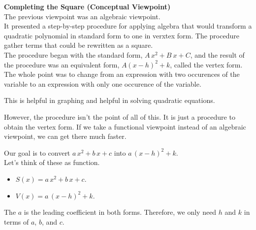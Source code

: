 \documentclass{ximera}
\begin{document}
\textbf{\textcolor{blue!55!black}{Completing the Square (Conceptual Viewpoint)}} \\






The previous viewpoint was an algebraic viewpoint.  \\

It presented a step-by-step procedure for applying algebra that would transform a quadratic polynomial in standard form to one in verxtex form.  The procedure gather terms that could be rewritten as a square.  \\

The procedure began with the standard form, $A \, x^2 + B \ x + C$, and the result of the procedure was an equivalent form, $A (x - h)^2 + k$, called the vertex form. \\










The whole point was to change from an expression with two occurences of the variable to an expression with only one occurence of the variable.

This is helpful in graphing and helpful in solving quadratic equations.


However, the procedure isn't the point of all of this.  It is just a procedure to obtain the vertex form.  If we take a functional viewpoint instead of an algebraic viewpoint, we can get there much faster.










Our goal is to convert $a \, x^2 + b \, x + c$ into $a \, (x - h)^2 + k$. \\

Let's think of these as function.


\begin{itemize}
\item $S(x) = a \, x^2 + b \, x + c$.
\item $V(x) = a \, (x - h)^2 + k$.
\end{itemize}



The $a$ is the leading coefficient in both forms.  Therefore, we only need $h$ and $k$ in terms of $a$, $b$, and $c$. \\
\end{document}
